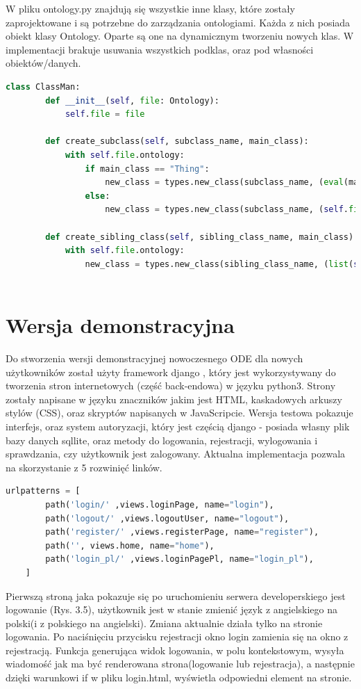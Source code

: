 \documentclass[a4paper,12pt, twoside]{book} %
\begin{document}
W pliku ontology.py znajdują się wszystkie inne klasy, które zostały zaprojektowane i są potrzebne do zarządzania ontologiami. Każda z nich posiada obiekt klasy Ontology. Oparte są one na dynamicznym tworzeniu nowych klas. W implementacji brakuje usuwania wszystkich podklas, oraz pod własności obiektów/danych.

\begin{lstlisting}[language=Python, basicstyle=\small, breaklines=true, caption={Przykładowe metody klasy ClassMan},  label={lst:class}]
	class ClassMan:
		def __init__(self, file: Ontology):
			self.file = file
		
		def create_subclass(self, subclass_name, main_class):
			with self.file.ontology:
				if main_class == "Thing":
					new_class = types.new_class(subclass_name, (eval(main_class),))
				else:
					new_class = types.new_class(subclass_name, (self.file.ontology[main_class],))
		
		def create_sibling_class(self, sibling_class_name, main_class):
			with self.file.ontology:
				new_class = types.new_class(sibling_class_name, (list(self.file.ontology[main_class].is_a)[0],))
				
\end{lstlisting}

\section{Wersja demonstracyjna}
Do stworzenia wersji demonstracyjnej nowoczesnego ODE dla nowych użytkowników został użyty framework django \cite{dj}, który jest wykorzystywany do tworzenia stron internetowych (część back-endowa) w języku python3. Strony zostały napisane w języku znaczników jakim jest HTML, kaskadowych arkuszy stylów (CSS), oraz skryptów napisanych w JavaScripcie. Wersja testowa pokazuje interfejs, oraz system autoryzacji, który jest częścią django - posiada własny plik bazy danych sqllite, oraz metody do logowania, rejestracji, wylogowania i sprawdzania, czy użytkownik jest zalogowany. Aktualna implementacja pozwala na skorzystanie z 5 rozwinięć linków.

\begin{lstlisting}[language=Python, basicstyle=\small, breaklines=true, caption={Paterny URL},  label={lst:class}]
	urlpatterns = [
		path('login/' ,views.loginPage, name="login"),
		path('logout/' ,views.logoutUser, name="logout"),
		path('register/' ,views.registerPage, name="register"),
		path('', views.home, name="home"),
		path('login_pl/' ,views.loginPagePl, name="login_pl"),
	]
\end{lstlisting}
Pierwszą stroną jaka pokazuje się po uruchomieniu serwera developerskiego jest logowanie (Rys. 3.5), użytkownik jest w stanie zmienić język z angielskiego na polski(i z polskiego na angielski). Zmiana aktualnie działa tylko na stronie logowania. Po naciśnięciu przycisku rejestracji okno login zamienia się na okno z rejestracją. Funkcja generująca widok logowania, w polu kontekstowym, wysyła wiadomość jak ma być renderowana strona(logowanie lub rejestracja), a następnie dzięki warunkowi if w pliku login.html, wyświetla odpowiedni element na stronie.
\end{document}
